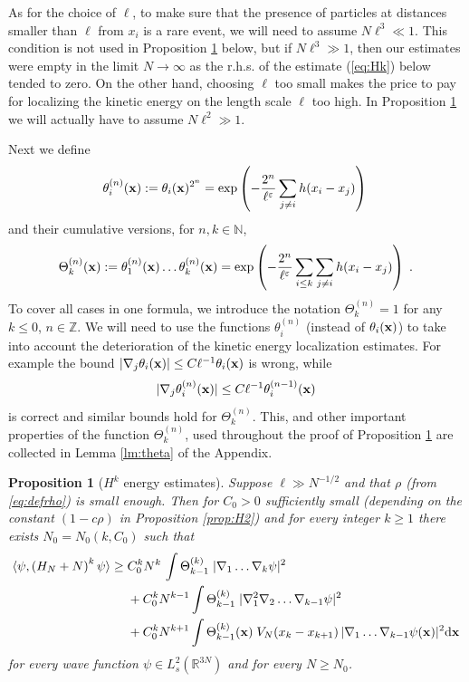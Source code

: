 \documentclass[11pt]{article}
\newtheorem{proposition}[theorem]{Proposition}
\newcommand{\rd}{{\rm d}}
\newcommand{\be}{\begin{equation}}
\newcommand{\ee}{\end{equation}}
\newcommand{\eps}{\varepsilon}
\newcommand{\bx}{{\bf x}}
\newcommand{\bR}{{\mathbb R}}
\newcommand{\bN}{{\mathbb N}}
\newcommand{\bZ}{{\mathbb Z}}
\begin{document}
As for the choice of $\ell$, to make sure that the presence of
particles at distances smaller than $\ell$ from $x_i$ is a rare
event, we will need to assume $N \ell^3 \ll 1$. This condition is
not used in Proposition \ref{prop:Hk} below, but if $N\ell^3 \gg 1$,
then our estimates were empty in the limit $N \to \infty$ as the
r.h.s. of the estimate (\ref{eq:Hk})
below  tended to zero. On the other hand, choosing
$\ell$ too small makes the price to pay for localizing the kinetic
energy on the length scale $\ell$ too high. In Proposition
\ref{prop:Hk} we will actually have to assume $N \ell^2 \gg1$.



 Next we define
\begin{equation}
\theta_i^{(n)}(\bx) := \theta_i (\bx)^{2^n} = \exp \left( -\frac{2^n}{\ell^{\eps}}
\sum_{j \neq i} h (x_i -x_j) \right) \,
\end{equation}
and their cumulative versions, for $n, k\in \bN$,
\be\label{eq:thetan}
  \Theta_k^{(n)} (\bx) := \theta_1^{(n)} (\bx)
\dots \theta_k^{(n)} (\bx) = \exp \left( -\frac{2^n}{\ell^{\eps}}
\sum_{i\leq k}\sum_{j \neq i} h (x_i -x_j) \right) \; . \ee To cover
all cases in one formula, we introduce the notation
$\Theta_k^{(n)}=1$ for any $k\leq 0$, $n\in \bZ$. We will need to
use the functions $\theta_i^{(n)}$ (instead of $\theta_i (\bx)$) to
take into account the deterioration of the kinetic energy
localization estimates. For example the bound \( |\nabla_j \theta_i
(\bx)| \leq C \ell^{-1} \theta_i (\bx)\) is wrong, while
\[ |\nabla_j \theta_i^{(n)} (\bx) | \leq C \ell^{-1} \theta_i^{(n-1)} (\bx)\] is
correct and similar bounds hold for $\Theta_k^{(n)}$.
 This, and other important properties of the function
$\Theta_k^{(n)}$, used throughout the proof of Proposition
\ref{prop:Hk} are collected in Lemma \ref{lm:theta} of the Appendix.

\medskip


\begin{proposition}[$H^k$ energy estimates]\label{prop:Hk}
Suppose $\ell \gg N^{-1/2}$ and that $\rho$ (from \eqref{eq:defrho})
is small enough. Then for $C_0
> 0$ sufficiently small (depending on the constant $(1-c\rho)$ in
Proposition \ref{prop:H2}) and for every integer $k\geq 1$ there
exists $N_0 = N_0 (k, C_0)$ such that
\begin{equation}\label{eq:Hk}
\begin{split}
\langle \psi, \left(H_N + N \right)^k \psi \rangle \geq \; &C_0^k
N^k \, \int \Theta^{(k)}_{k-1} \;
|\nabla_1 \dots \nabla_k \psi|^2 \\ &+C_0^k N^{k-1} \int
\Theta_{k-1}^{(k)} \; |\nabla_1^2 \nabla_2 \dots \nabla_{k-1} \psi |^2 \\
&+ C_0^k N^{k+1} \int \Theta_{k-1}^{(k)}
(\bx)  \; V_N (x_{k} -x_{k+1}) \, |\nabla_1 \dots \nabla_{k-1} \psi
(\bx)|^2\rd\bx
\end{split}
\end{equation} for every wave function $\psi \in L^2_s (\bR^{3N})$
and for every $N \geq N_0$.
\end{proposition}
\end{document}
